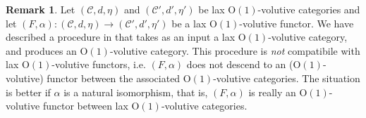 \documentclass{article}
\newcommand{\Oone}{\operatorname{O(1)}}
\newcommand{\C}{\mathcal{C}}
\numberwithin{equation}{section}
\theoremstyle{definition}
\newtheorem{remark}[definition]{Remark}
\theoremstyle{theorem}
\begin{document}
\begin{remark}
    Let $(\C,d,\eta)$ and $(\C',d',\eta')$ be lax $\Oone$-volutive categories and let 
    $(F,\alpha) \colon (\C,d,\eta) \to (\C',d',\eta')$ be a lax $\Oone$-volutive functor. We have described a procedure in 
    that takes as an input a lax $\Oone$-volutive category, and produces an $\Oone$-volutive category. This procedure is \emph{not} compatibile with 
    lax $\Oone$-volutive functors, i.e. $(F,\alpha)$ does not descend to an ($\Oone$-volutive) functor between the associated $\Oone$-volutive categories. 
    The situation is better if $\alpha$ is a natural isomorphism, that is, $(F,\alpha)$ is really an $\Oone$-volutive functor between lax $\Oone$-volutive categories. 
\end{remark}
\end{document}
